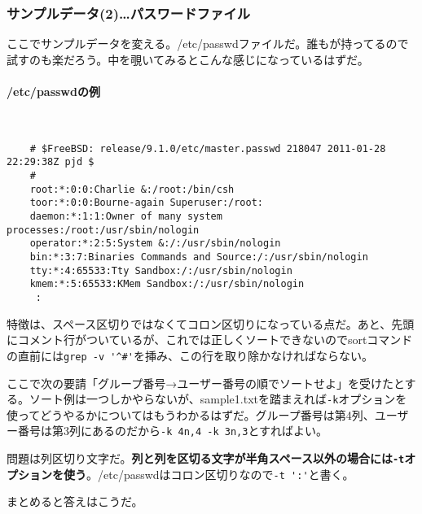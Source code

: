 \subsubsection*{サンプルデータ(2)…パスワードファイル}

ここでサンプルデータを変える。/etc/passwdファイルだ。誰もが持ってるので試すのも楽だろう。中を覗いてみるとこんな感じになっているはずだ。

\paragraph*{/etc/passwdの例}　\\
\begin{frameboxit}{160.0mm}
\begin{verbatim}
	# $FreeBSD: release/9.1.0/etc/master.passwd 218047 2011-01-28 22:29:38Z pjd $
	#
	root:*:0:0:Charlie &:/root:/bin/csh
	toor:*:0:0:Bourne-again Superuser:/root:
	daemon:*:1:1:Owner of many system processes:/root:/usr/sbin/nologin
	operator:*:2:5:System &:/:/usr/sbin/nologin
	bin:*:3:7:Binaries Commands and Source:/:/usr/sbin/nologin
	tty:*:4:65533:Tty Sandbox:/:/usr/sbin/nologin
	kmem:*:5:65533:KMem Sandbox:/:/usr/sbin/nologin
	 :
\end{verbatim}
\end{frameboxit}

特徴は、スペース区切りではなくてコロン区切りになっている点だ。あと、先頭にコメント行がついているが、これでは正しくソートできないのでsortコマンドの直前には\verb|grep -v '^#'|を挿み、この行を取り除かなければならない。

ここで次の要請「グループ番号→ユーザー番号の順でソートせよ」を受けたとする。ソート例は一つしかやらないが、sample1.txtを踏まえれば\verb|-k|オプションを使ってどうやるかについてはもうわかるはずだ。グループ番号は第4列、ユーザー番号は第3列にあるのだから\verb|-k 4n,4 -k 3n,3|とすればよい。

問題は列区切り文字だ。\textbf{列と列を区切る文字が半角スペース以外の場合には\verb|-t|オプションを使う}。/etc/passwdはコロン区切りなので\verb|-t ':'|と書く。

まとめると答えはこうだ。

